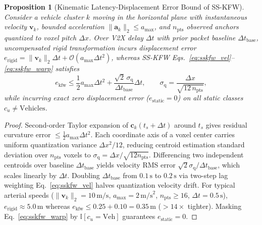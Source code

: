 \documentclass[journal]{IEEEtran}
\newtheorem{proposition}{Proposition}
\begin{document}
\begin{proposition}[Kinematic Latency-Displacement Error Bound of SS-KFW]
Consider a vehicle cluster $k$ moving in the horizontal plane with instantaneous velocity $\mathbf{v}_k$, bounded acceleration $\|\mathbf{a}_k\|_2 \le a_{\max}$, and $n_{\mathrm{pts}}$ observed anchors quantized to voxel pitch $\Delta x$. Over V2X delay $\Delta t$ with prior packet baseline $\Delta t_{\mathrm{base}}$, uncompensated rigid transformation incurs displacement error $e_{\mathrm{rigid}} = \|\mathbf{v}_k\|_2 \Delta t + \mathcal{O}(a_{\max}\Delta t^2)$, whereas SS-KFW Eqs.~\eqref{eq:sskfw_vel}--\eqref{eq:sskfw_warp} satisfies
\begin{equation}
e_{\mathrm{kfw}} \le \frac{1}{2} a_{\max} \Delta t^2 + \frac{\sqrt{2}\,\sigma_{\mathrm{q}}}{\Delta t_{\mathrm{base}}} \Delta t, \qquad \sigma_{\mathrm{q}} = \frac{\Delta x}{\sqrt{12\,n_{\mathrm{pts}}}},
\label{eq:kfw_bound}
\end{equation}
while incurring exact zero displacement error ($e_{\mathrm{static}} = 0$) on all static classes $c_u \neq \mathrm{Vehicles}$.
\end{proposition}
\begin{proof}
Second-order Taylor expansion of $\mathbf{c}_k(t_s + \Delta t)$ around $t_s$ gives residual curvature error $\le \frac{1}{2} a_{\max} \Delta t^2$. Each coordinate axis of a voxel center carries uniform quantization variance $\Delta x^2/12$, reducing centroid estimation standard deviation over $n_{\mathrm{pts}}$ voxels to $\sigma_{\mathrm{q}} = \Delta x / \sqrt{12 n_{\mathrm{pts}}}$. Differencing two independent centroids over baseline $\Delta t_{\mathrm{base}}$ yields velocity RMS error $\sqrt{2}\sigma_{\mathrm{q}} / \Delta t_{\mathrm{base}}$, which scales linearly by $\Delta t$. Doubling $\Delta t_{\mathrm{base}}$ from $0.1\,\mathrm{s}$ to $0.2\,\mathrm{s}$ via two-step lag weighting Eq.~\eqref{eq:sskfw_vel} halves quantization velocity drift. For typical arterial speeds ($\|\mathbf{v}_k\|_2 = 10\,\mathrm{m/s}$, $a_{\max} = 2\,\mathrm{m/s}^2$, $n_{\mathrm{pts}} \ge 16$, $\Delta t = 0.5\,\mathrm{s}$), $e_{\mathrm{rigid}} \approx 5.0\,\mathrm{m}$ whereas $e_{\mathrm{kfw}} \le 0.25 + 0.10 = 0.35\,\mathrm{m}$ ($>14\times$ tighter). Masking Eq.~\eqref{eq:sskfw_warp} by $\mathbb{I}[c_u = \mathrm{Veh}]$ guarantees $e_{\mathrm{static}} = 0$.
\end{proof}
\end{document}
